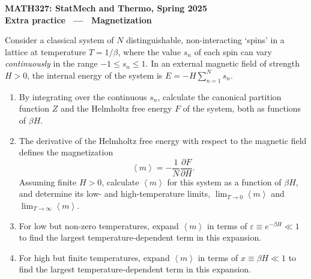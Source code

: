 \documentclass[12 pt]{article} %
\newcommand{\be}{\ensuremath{\beta} }
\newcommand{\eps}{\ensuremath{\varepsilon} }
\newcommand{\vev}[1]{\ensuremath{\left\langle #1 \right\rangle} }
\newcommand{\pderiv}[2]{\ensuremath{\frac{\partial #1}{\partial #2}} }
\begin{document}
\newcommand{\thisunit}{MATH327 Extra (Magnetization)}
\newcommand{\moddate}{Last modified 12 May 2025}
\begin{center}
  {\Large \textbf{MATH327: StatMech and Thermo, Spring 2025}} \\[12 pt]
  {\Large \textbf{Extra practice \ --- \ Magnetization}} \\[24 pt]
\end{center}

Consider a classical system of $N$ distinguishable, non-interacting `spins' in a lattice at temperature $T = 1 / \be$, where the value $s_n$ of each spin can vary \emph{continuously} in the range $-1 \leq s_n \leq 1$.
In an external magnetic field of strength $H > 0$, the internal energy of the system is $\displaystyle E = -H \sum_{n = 1}^N s_n$.

\begin{enumerate}[label={(\alph*)}]
  \item By integrating over the continuous $s_n$, calculate the canonical partition function $Z$ and the Helmholtz free energy $F$ of the system, both as functions of $\be H$.

  \item The derivative of the Helmholtz free energy with respect to the magnetic field defines the magnetization
        \begin{equation*}
          \vev{m} = -\frac{1}{N} \pderiv{F}{H}.
        \end{equation*}
        Assuming finite $H > 0$, calculate $\vev{m}$ for this system as a function of $\be H$, and determine its low- and high-temperature limits, $\displaystyle \lim_{T \to 0} \vev{m}$ and $\displaystyle \lim_{T \to \infty} \vev{m}$.

  \item For low but non-zero temperatures, expand $\vev{m}$ in terms of $\eps \equiv e^{-\be H} \ll 1$ to find the largest temperature-dependent term in this expansion.

  \item For high but finite temperatures, expand $\vev{m}$ in terms of $x \equiv \be H \ll 1$ to find the largest temperature-dependent term in this expansion.
\end{enumerate}
\end{document}
